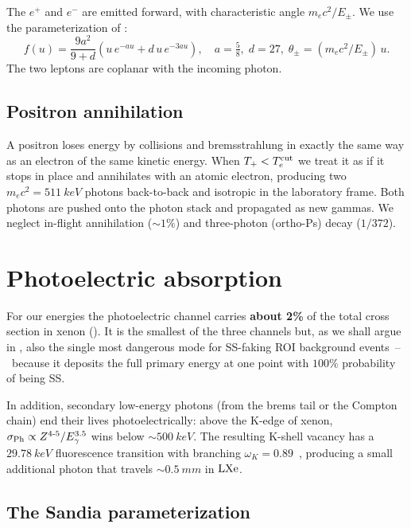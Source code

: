\documentclass[11pt,a4paper]{article}
\newcommand{\Eg}{E_\gamma}
\newcommand{\me}{m_e c^2}
\newcommand{\Tcut}{T_e^{\rm cut}}
\begin{document}
The $e^+$ and $e^-$ are emitted forward, with characteristic angle
$\me/E_\pm$. We use the parameterization of \cite{Urban1993,G4-PRM}:
\begin{equation}
  f(u) = \frac{9a^2}{9+d}(u\,e^{-au} + d\,u\,e^{-3au}),
  \quad a=\tfrac{5}{8},\; d=27,\;
  \theta_\pm = (\me/E_\pm)\,u .
\end{equation}
The two leptons are coplanar with the incoming photon.

\subsection{Positron annihilation}\label{sec:annih}

A positron loses energy by collisions and bremsstrahlung in
exactly the same way as an electron of the same kinetic energy.
When $T_+ < \Tcut$ we treat it as if it stops in place and
annihilates with an atomic electron, producing two
$\me=\SI{511}{keV}$ photons back-to-back and isotropic in the
laboratory frame. Both photons are pushed onto the photon stack
and propagated as new gammas. We neglect in-flight annihilation
(\(\sim 1\%\)) and three-photon (ortho-Ps) decay
(\(1/372\)).

\section{Photoelectric absorption}\label{sec:phot}

For our energies the photoelectric channel carries
\textbf{about 2\%} of the total cross section in xenon
(). It is the smallest of the three channels
but, as we shall argue in , also the single most
dangerous mode for SS-faking ROI background events~--~because it
deposits the full primary energy at one point with $100\%$
probability of being SS.

In addition, secondary low-energy photons (from the brems tail or
the Compton chain) end their lives photoelectrically: above the
K-edge of xenon, $\sigma_{\rm Ph}\propto Z^{4\text{-}5}/\Eg^{3.5}$
wins below $\sim\SI{500}{keV}$. The resulting K-shell vacancy
has a $\SI{29.78}{keV}$ fluorescence transition with branching
$\omega_K=0.89$~\cite{Krause1979}, producing a small additional
photon that travels $\sim\SI{0.5}{mm}$ in $\rm LXe$.

\subsection{The Sandia parameterization}
\end{document}
